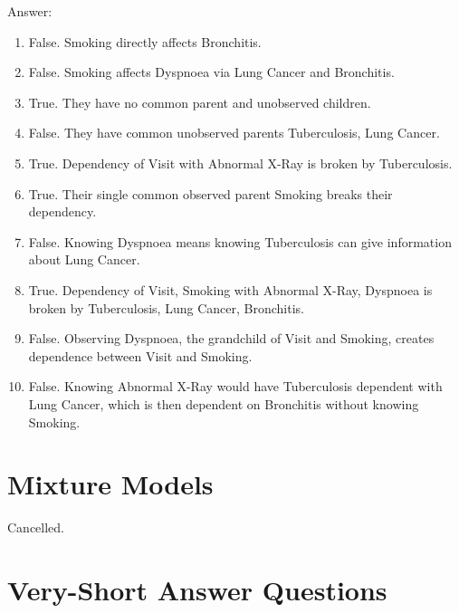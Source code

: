 \documentclass{article}
\def\ans#1{\par\gre{Answer: #1}}
\def\gre#1{{\color{gre}#1}}
\begin{document}
\pagebreak

\ans{
\begin{enumerate}
\item False. Smoking directly affects Bronchitis.
\item False. Smoking affects Dyspnoea via Lung Cancer and Bronchitis.
\item True. They have no common parent and unobserved children.
\item False. They have common unobserved parents Tuberculosis, Lung Cancer.
\item True. Dependency of Visit with Abnormal X-Ray is broken by Tuberculosis.
\item True. Their single common observed parent Smoking breaks their dependency.
\item False. Knowing Dyspnoea means knowing Tuberculosis can give information about Lung Cancer.
\item True. Dependency of Visit, Smoking with Abnormal X-Ray, Dyspnoea is broken by Tuberculosis, Lung Cancer, Bronchitis.
\item False. Observing Dyspnoea, the grandchild of Visit and Smoking, creates dependence between Visit and Smoking.
\item False. Knowing Abnormal X-Ray would have Tuberculosis dependent with Lung Cancer, which is then dependent on Bronchitis without knowing Smoking.
\end{enumerate}
}

\pagebreak

\section{Mixture Models}

Cancelled.

\pagebreak

\section{Very-Short Answer Questions}
\end{document}
